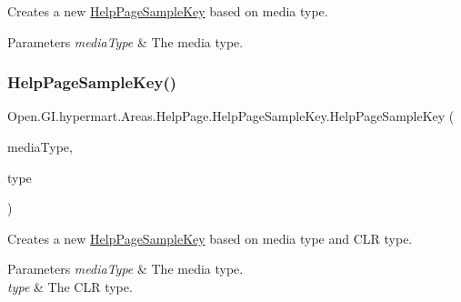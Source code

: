 Creates a new \hyperlink{class_open_1_1_g_i_1_1hypermart_1_1_areas_1_1_help_page_1_1_help_page_sample_key}{Help\+Page\+Sample\+Key} based on media type. 


\begin{DoxyParams}{Parameters}
{\em media\+Type} & The media type.\\
\hline
\end{DoxyParams}
\hypertarget{class_open_1_1_g_i_1_1hypermart_1_1_areas_1_1_help_page_1_1_help_page_sample_key_a17332c9908a0efd7d9c68d15f2217170}{}\label{class_open_1_1_g_i_1_1hypermart_1_1_areas_1_1_help_page_1_1_help_page_sample_key_a17332c9908a0efd7d9c68d15f2217170} 
\subsubsection{\texorpdfstring{Help\+Page\+Sample\+Key()}{HelpPageSampleKey()}\hspace{0.1cm}{\footnotesize\ttfamily [2/4]}}
{\footnotesize\ttfamily Open.\+G\+I.\+hypermart.\+Areas.\+Help\+Page.\+Help\+Page\+Sample\+Key.\+Help\+Page\+Sample\+Key (\begin{DoxyParamCaption}\item[{Media\+Type\+Header\+Value}]{media\+Type,  }\item[{Type}]{type }\end{DoxyParamCaption})}



Creates a new \hyperlink{class_open_1_1_g_i_1_1hypermart_1_1_areas_1_1_help_page_1_1_help_page_sample_key}{Help\+Page\+Sample\+Key} based on media type and C\+LR type. 


\begin{DoxyParams}{Parameters}
{\em media\+Type} & The media type.\\
\hline
{\em type} & The C\+LR type.\\
\hline
\end{DoxyParams}
\hypertarget{class_open_1_1_g_i_1_1hypermart_1_1_areas_1_1_help_page_1_1_help_page_sample_key_a98e3f2c1797d9c12a29d6aaca315fef9}{}\label{class_open_1_1_g_i_1_1hypermart_1_1_areas_1_1_help_page_1_1_help_page_sample_key_a98e3f2c1797d9c12a29d6aaca315fef9} 
